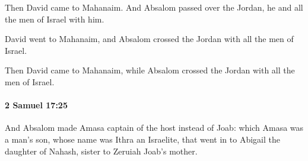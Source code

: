 			\begin{versebox}
					\item[BHS] 
					\item[ASV] Then David came to Mahanaim. And Absalom passed over the Jordan, he and all the men of Israel with him.
					\item[NIV] David went to Mahanaim, and Absalom crossed the Jordan with all the men of Israel.
					\item[NRSV] Then David came to Mahanaim, while Absalom crossed the Jordan with all the men of Israel.
			\end{versebox}

		\paragraph{2 Samuel 17:25} %
			\label{2SAMUEL-17-25}

			And Absalom made Amasa captain of the host instead of Joab: which Amasa was a man’s son, whose name was Ithra an Israelite, that went in to Abigail the daughter of Nahash, sister to Zeruiah Joab’s mother.

